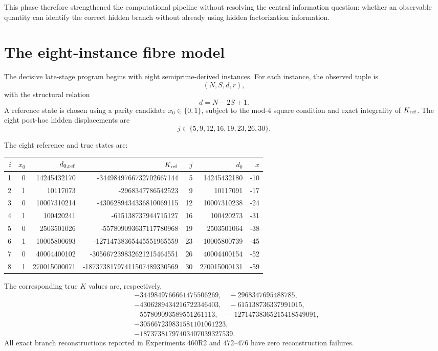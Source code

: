 \documentclass[11pt,a4paper]{article}
\begin{document}
This phase therefore strengthened the computational pipeline without resolving the central information question: whether an observable quantity can identify the correct hidden branch without already using hidden factorization information.

\section{The eight-instance fibre model}

The decisive late-stage program begins with eight semiprime-derived instances. For each instance, the observed tuple is
\begin{equation}
(N,S,d,r),
\end{equation}
with the structural relation
\begin{equation}
d=N-2S+1.
\end{equation}
A reference state is chosen using a parity candidate $x_0\in\{0,1\}$, subject to the mod-$4$ square condition and exact integrality of $K_{\rm ref}$. The eight post-hoc hidden displacements are
\begin{equation}
j\in\{5,9,12,16,19,23,26,30\}.
\end{equation}

The eight reference and true states are:
\begin{center}
\small
\begin{tabular}{r|r|r|r|r|r|r}
\toprule
$i$ & $x_0$ & $d_{0,\rm ref}$ & $K_{\rm ref}$ & $j$ & $d_0$ & $x$\\
\midrule
1&0&14245432170&-3449849766732702667144&5&14245432180&-10\\
2&1&10117073&-2968347786542523&9&10117091&-17\\
3&0&10007310214&-4306289434336810069115&12&10007310238&-24\\
4&1&100420241&-615138737944715127&16&100420273&-31\\
5&0&2503501026&-557809093637117780968&19&2503501064&-38\\
6&1&10005800693&-12714738365445551965559&23&10005800739&-45\\
7&0&40004400102&-305667239832621215464551&26&40004400154&-52\\
8&1&270015000071&-18737381797411507489330569&30&270015000131&-59\\\bottomrule
\end{tabular}
\end{center}

The corresponding true $K$ values are, respectively,
\[
\begin{aligned}
&-3449849766661475506269,\quad -2968347695488785,\\
&-4306289434216722346403,\quad -615138736337991015,\\
&-557809093589551261113,\quad -12714738365215418549091,\\
&-305667239831581101061223,\\
&-18737381797403407039327539.
\end{aligned}
\]
All exact branch reconstructions reported in Experiments 460R2 and 472--476 have zero reconstruction failures.
\end{document}
